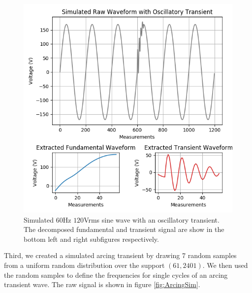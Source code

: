 \documentclass[10pt, conference, compsocconf]{IEEEtran}
\begin{document}
\begin{figure}[ht]
\centering%
\includegraphics[scale=0.35]{./figures/oscillatory_sim.png}
\caption{Simulated $60$Hz $120$Vrms sine wave with an oscillatory transient. The decomposed fundamental and transient signal are show in the bottom left and right subfigures respectively.}\label{fig:OscillatorySim}
\end{figure}

Third, we created a simulated arcing transient by drawing 7 random samples from a uniform random distribution over the support $(61, 2401)$. We then used the random samples to define the frequencies for single cycles of an arcing transient wave. The raw signal is shown in figure \ref{fig:ArcingSim}.
\end{document}
